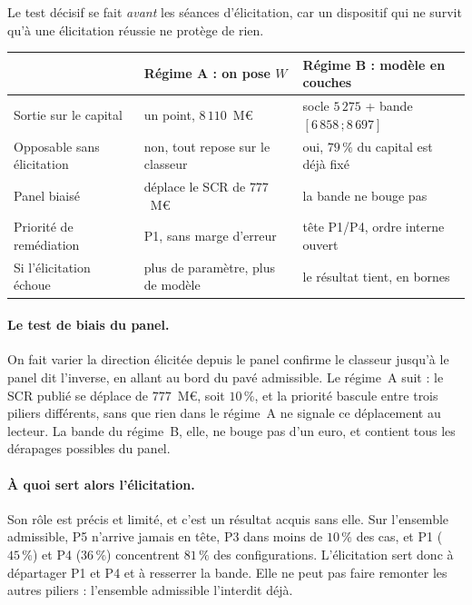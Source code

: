 Le test décisif se fait \emph{avant} les séances d'élicitation, car un dispositif qui ne
survit qu'à une élicitation réussie ne protège de rien.

\begin{center}\footnotesize
\renewcommand{\arraystretch}{1.3}
\begin{tabular}{@{}p{4.1cm} p{4.5cm} p{5.6cm}@{}}
\toprule
 & \textbf{Régime A : on pose $W$} & \textbf{Régime B : modèle en couches} \\
\midrule
Sortie sur le capital & un point, $8\,110$~M\euro{} & socle $5\,275$ + bande $[6\,858\,;8\,697]$ \\
Opposable sans élicitation & non, tout repose sur le classeur & oui, $79\,\%$ du capital est déjà fixé \\
Panel biaisé & déplace le SCR de $777$~M\euro{} & la bande ne bouge pas \\
Priorité de remédiation & P1, sans marge d'erreur & tête P1/P4, ordre interne ouvert \\
Si l'élicitation échoue & plus de paramètre, plus de modèle & le résultat tient, en bornes \\
\bottomrule
\end{tabular}
\end{center}

\paragraph{Le test de biais du panel.} On fait varier la direction élicitée depuis
\og{}le panel confirme le classeur\fg{} jusqu'à \og{}le panel dit l'inverse\fg{}, en
allant au bord du pavé admissible. Le régime~A suit : le SCR publié se déplace de
$777$~M\euro{}, soit $10\,\%$, et la priorité bascule entre trois piliers différents,
sans que rien dans le régime~A ne signale ce déplacement au lecteur. La bande du
régime~B, elle, ne bouge pas d'un euro, et contient tous les dérapages possibles du panel.

\paragraph{À quoi sert alors l'élicitation.} Son rôle est précis et limité, et c'est un
résultat acquis sans elle. Sur l'ensemble admissible, P5 n'arrive jamais en
tête, P3 dans moins de $10\,\%$ des cas, et P1 ($45\,\%$) et P4 ($36\,\%$) concentrent
$81\,\%$ des configurations. L'élicitation sert donc à départager P1 et P4 et à
resserrer la bande. Elle ne peut pas faire remonter les autres piliers : l'ensemble
admissible l'interdit déjà.

